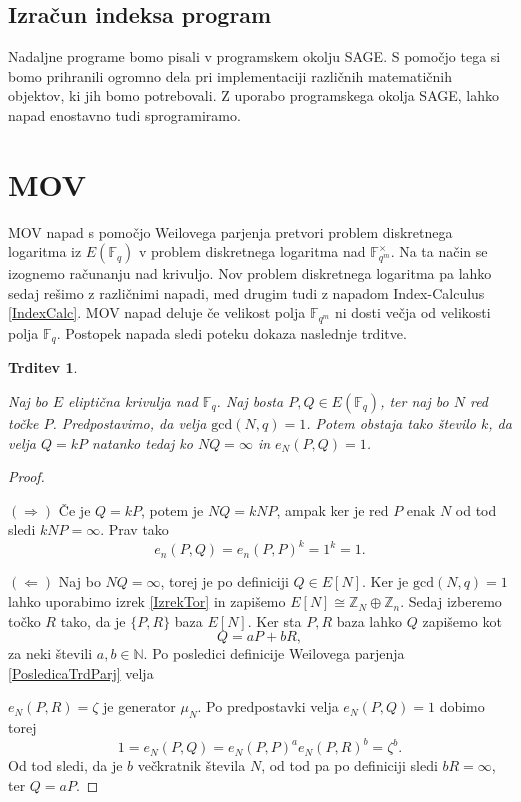 \documentclass[12pt,a4paper,twoside]{article}
\theoremstyle{definition} %
\theoremstyle{plain} %
\newtheorem{trditev}[definicija]{Trditev}
\numberwithin{equation}{section}  %
\newcommand{\N}{\mathbb N}
\newcommand{\Z}{\mathbb Z}
\newcommand{\F}{\mathbb F}
\begin{document}
\subsection{Izračun indeksa program}

Nadaljne programe bomo pisali v programskem okolju SAGE. S pomočjo tega si bomo prihranili ogromno dela pri implementaciji različnih matematičnih objektov, ki jih bomo potrebovali.
Z uporabo programskega okolja SAGE, lahko napad enostavno tudi sprogramiramo.



\newpage

\section{MOV}
MOV napad s pomočjo Weilovega parjenja pretvori problem diskretnega logaritma iz $E(\F_{q})$ v problem diskretnega logaritma nad $\F^{\times}_{q^m}$. Na ta način se izognemo računanju nad krivuljo. Nov problem diskretnega logaritma pa lahko sedaj rešimo z različnimi napadi, med drugim tudi z napadom Index-Calculus \ref{IndexCalc}. MOV napad deluje če velikost polja $\F_{q^m}$ ni dosti večja od velikosti polja $\F_{q}$. Postopek napada sledi poteku dokaza naslednje trditve.

\begin{trditev}~

\label{trd:5.1}
Naj bo $E$ eliptična krivulja nad $\F_{q}$. Naj bosta $P,Q \in E(\F_{q})$, ter naj bo $N$ red točke $P$. Predpostavimo, da velja $\text{gcd}(N,q)=1$. Potem obstaja tako število $k$, da velja $Q = kP$ natanko tedaj ko $NQ = \infty$ in $e_N(P,Q)=1$.
\end{trditev}

\begin{proof}~

$(\Rightarrow)$ Če je $Q = kP$, potem je $NQ = kNP$, ampak ker je red $P$ enak $N$ od tod sledi $kNP = \infty$. Prav tako
$$e_n(P,Q) = e_n(P,P)^k = 1^k = 1.$$

$(\Leftarrow)$ Naj bo $NQ = \infty$, torej je po definiciji $Q \in E[N]$. Ker je $\text{gcd}(N,q) = 1$ lahko uporabimo izrek \ref{IzrekTor} in zapišemo 
$E[N] \cong \Z_N \oplus \Z_n$. Sedaj izberemo točko $R$ tako, da je $\{P,R \}$ baza $E[N]$. Ker sta $P,R$ baza  lahko $Q$ zapišemo kot
$$Q = aP+bR,$$
za neki števili $a,b \in \N$. Po posledici definicije Weilovega parjenja \ref{PosledicaTrdParj} velja 

\noindent $e_N(P,R)=\zeta$ je generator $\mu_N$.
Po predpostavki velja $e_N(P,Q) = 1$ dobimo torej
$$1 = e_N(P,Q) = e_N(P,P)^ae_N(P,R)^b = \zeta^b.$$
Od tod sledi, da je $b$ večkratnik števila $N$, od tod pa po definiciji sledi $bR = \infty$, ter $Q = aP$.
\end{proof}
\end{document}
